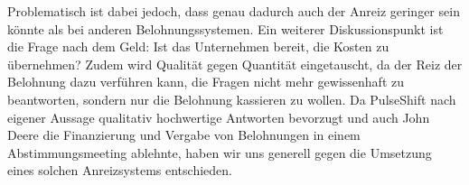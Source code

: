 Problematisch ist dabei jedoch, dass genau dadurch auch der Anreiz geringer sein könnte als bei anderen Belohnungssystemen. Ein weiterer Diskussionspunkt ist die Frage nach dem Geld: Ist das Unternehmen bereit, die Kosten zu übernehmen? Zudem wird Qualität gegen Quantität eingetauscht, da der Reiz der Belohnung dazu verführen kann, die Fragen nicht mehr gewissenhaft zu beantworten, sondern nur die Belohnung kassieren zu wollen. Da PulseShift nach eigener Aussage qualitativ hochwertige Antworten bevorzugt und auch John Deere die Finanzierung und Vergabe von Belohnungen in einem Abstimmungsmeeting ablehnte, haben wir uns generell gegen die Umsetzung eines solchen Anreizsystems entschieden.